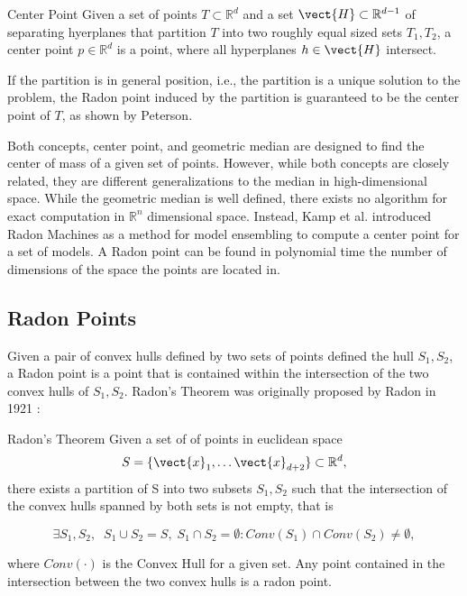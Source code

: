 \begin{definition}[parbox=false]{Center Point}
    Given a set of points $T \subset \mathbb{R}^{d}$ and a set  $\vect{H} \subset \mathbb{R}^{d-1}$ of separating hyerplanes that partition $T$  into two roughly equal sized sets $T_1, T_2$, a center point $p \in \mathbb{R}^d$ is a point, where all hyperplanes $h \in \vect{H}$ intersect.

    If the partition is in general position, i.e., the partition is a unique solution to the problem, the Radon point induced by the partition is guaranteed to be the center point of $T$, as shown by Peterson.~\cite{peterson1972geometry}
\end{definition}

Both concepts, center point, and geometric median are designed to find the center of mass of a given set of points.
However, while both concepts are closely related, they are different generalizations to the median in high-dimensional space.
While the geometric median is well defined, there exists no algorithm for exact computation in $\mathbb{R}^n$ dimensional space.
Instead, Kamp et al. \cite{kamp2017effective} introduced Radon Machines as a method for model ensembling to compute a center point for a set of models.
A Radon point can be found in polynomial time \wrt the number of dimensions of the space the points are located in.
\subsection{Radon Points}
Given a pair of convex hulls defined by two sets of points defined the hull $S_1, S_2$, a Radon point is a point that is contained within the intersection of the two convex hulls of $S_1, S_2$. 
Radon's Theorem was originally proposed by Radon in 1921 \cite{radon1921mengen}:

\begin{threm}[label=thm:radon]{Radon's Theorem}
    Given a set of of points in euclidean space
    \begin{equation}
        S = \{\vect{x}_1, \ldots \vect{x}_{d+2}\} \subset \mathbb{R}^d,
    \end{equation}
   there exists a partition of S into two subsets $S_1, S_2$ such that the intersection of the convex hulls spanned by both sets is not empty, that is
    
    \begin{equation}
        \exists S_1, S_2, \;\; S_1 \cup S_2 = S, \; S_1 \cap S_2 = \emptyset: Conv(S_1) \cap Conv(S_2) \neq \emptyset,
    \end{equation}

    where $Conv(\cdot)$ is the Convex Hull for a given set.
    Any point contained in the intersection between the two convex hulls is a radon point.
\end{threm}

